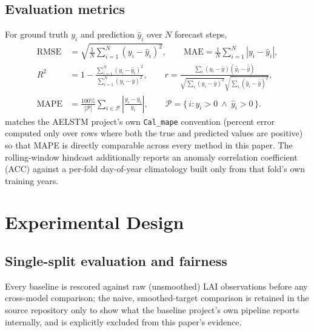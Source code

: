 \documentclass[11pt]{article}
\begin{document}
\subsection{Evaluation metrics}
\label{sec:methods-metrics}

For ground truth $y_i$ and prediction $\hat{y}_i$ over $N$ forecast steps,
\begin{align}
  \mathrm{RMSE} &= \sqrt{\frac{1}{N}\sum_{i=1}^{N}(y_i - \hat{y}_i)^2}, \qquad
  \mathrm{MAE} = \frac{1}{N}\sum_{i=1}^{N}|y_i - \hat{y}_i|, \\
  R^2 &= 1 - \frac{\sum_{i=1}^{N}(y_i - \hat{y}_i)^2}{\sum_{i=1}^{N}(y_i - \bar{y})^2}, \qquad
  r = \frac{\sum_i (y_i - \bar y)(\hat y_i - \bar{\hat y})}{\sqrt{\sum_i (y_i - \bar y)^2}\sqrt{\sum_i (\hat y_i - \bar{\hat y})^2}}, \\
  \mathrm{MAPE} &= \frac{100\%}{|\mathcal{P}|}\sum_{i \in \mathcal{P}} \left|\frac{y_i - \hat{y}_i}{y_i}\right|,
  \qquad \mathcal{P} = \{\, i : y_i > 0 \ \wedge\ \hat{y}_i > 0 \,\}. \label{eq:mape}
\end{align}
 matches the AELSTM project's own \texttt{Cal\_mape} convention (percent error
computed only over rows where both the true and predicted values are positive) so that MAPE is
directly comparable across every method in this paper. The rolling-window hindcast additionally reports an anomaly
correlation coefficient (ACC) against a per-fold day-of-year climatology built only from that
fold's own training years.

\section{Experimental Design}
\label{sec:expdesign}

\subsection{Single-split evaluation and fairness}
\label{sec:expdesign-single}

Every baseline is rescored against raw (unsmoothed) LAI observations before any cross-model
comparison; the naive, smoothed-target comparison is retained in the source repository only to
show what the baseline project's own pipeline reports internally, and is explicitly excluded from
this paper's evidence.
\end{document}
